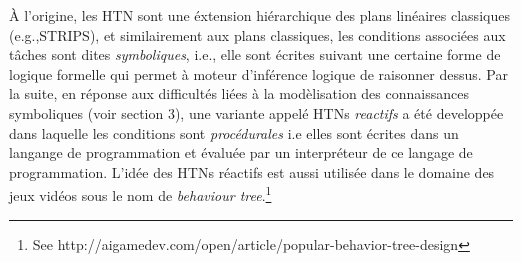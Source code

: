 \documentclass[a4paper,twoside,french]{article}
\begin{document}
				\`A l'origine, les HTN sont une \'extension hi\'erarchique des plans lin\'eaires classiques (e.g.,STRIPS), et similairement aux plans classiques, les conditions associ\'ees aux t\^aches sont dites \textit{symboliques}, i.e., elle sont \'ecrites suivant une certaine forme de logique formelle qui permet à moteur d'inf\'erence logique de raisonner dessus. Par la suite, en r\'eponse aux difficult\'es li\'ees \`a la mod\`elisation des connaissances symboliques (voir section 3), une variante appel\'e HTNs \textit{reactifs} a \'et\'e developp\'ee dans laquelle les conditions sont \textit{proc\'edurales} i.e elles sont \'ecrites dans un langange de programmation et \'evalu\'ee par un interpr\'eteur de ce langage de programmation. L'id\'ee des HTNs réactifs est aussi utilis\'ee dans le domaine des jeux vid\'eos sous le nom de \emph{behaviour tree}.\footnote{See http://aigamedev.com/open/article/popular-behavior-tree-design}
				
\end{document}
